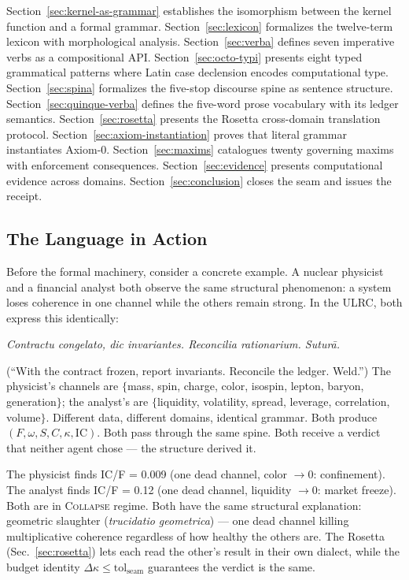\documentclass[
  aps,
  prd,
  twocolumn,
  superscriptaddress,
  nofootinbib,
  floatfix
]{revtex4-2}
\newcommand{\tolseam}{\mathrm{tol}_{\mathrm{seam}}}
\newcommand{\regime}[1]{\textrm{\upshape\scshape#1}}
\newcommand{\Fid}{F}
\newcommand{\Drft}{\omega}
\newcommand{\Ent}{S}
\newcommand{\Curv}{C}
\newcommand{\Logint}{\kappa}
\newcommand{\IC}{\mathrm{IC}}
\newcommand{\lat}[1]{\textit{#1}}
\begin{document}
Section~\ref{sec:kernel-as-grammar} establishes the isomorphism
between the kernel function and a formal grammar.
Section~\ref{sec:lexicon} formalizes the twelve-term lexicon
with morphological analysis.
Section~\ref{sec:verba} defines seven imperative verbs as a
compositional API.
Section~\ref{sec:octo-typi} presents eight typed grammatical
patterns where Latin case declension encodes computational type.
Section~\ref{sec:spina} formalizes the five-stop discourse spine
as sentence structure.
Section~\ref{sec:quinque-verba} defines the five-word prose
vocabulary with its ledger semantics.
Section~\ref{sec:rosetta} presents the Rosetta cross-domain
translation protocol.
Section~\ref{sec:axiom-instantiation} proves that literal
grammar instantiates Axiom-0.
Section~\ref{sec:maxims} catalogues twenty governing maxims
with enforcement consequences.
Section~\ref{sec:evidence} presents computational evidence
across domains.
Section~\ref{sec:conclusion} closes the seam and issues the
receipt.

\subsection{The Language in Action}\label{sec:action}

Before the formal machinery, consider a concrete example. A
nuclear physicist and a financial analyst both observe the same
structural phenomenon: a system loses coherence in one channel
while the others remain strong. In the ULRC, both express this
identically:

\smallskip
\noindent\lat{Contractu congelato, dic invariantes.
Reconcilia rationarium. Sutur\=a.}

\smallskip\noindent
(``With the contract frozen, report invariants. Reconcile the
ledger. Weld.'') The physicist's channels are
$\{$mass, spin, charge, color, isospin, lepton, baryon,
generation$\}$; the analyst's are $\{$liquidity, volatility,
spread, leverage, correlation, volume$\}$. Different data,
different domains, identical grammar. Both produce
$(\Fid, \Drft, \Ent, \Curv, \Logint, \IC)$. Both pass through
the same spine. Both receive a verdict that neither agent
chose --- the structure derived it.

The physicist finds IC/F = 0.009 (one dead channel, color
$\to 0$: confinement). The analyst finds IC/F = 0.12
(one dead channel, liquidity $\to 0$: market freeze).
Both are in \regime{Collapse} regime. Both have the same
structural explanation: geometric slaughter
(\lat{trucidatio geometrica}) --- one dead channel killing
multiplicative coherence regardless of how healthy the
others are. The Rosetta
(Sec.~\ref{sec:rosetta}) lets each read the other's result
in their own dialect, while the budget identity
$\Delta\Logint \leq \tolseam$ guarantees the verdict is the
same.
\end{document}
